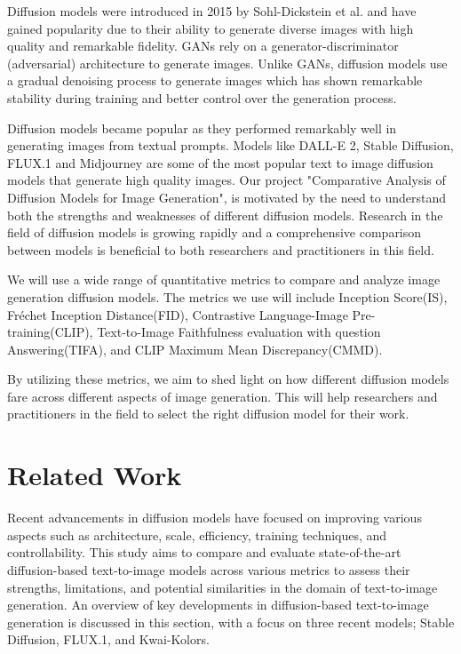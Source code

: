 \documentclass{article}
\begin{document}
Diffusion models were introduced in 2015 by Sohl-Dickstein et al.\cite{sohl2015} and have gained popularity 
due to their ability to generate diverse images with high quality and remarkable fidelity. GANs rely on a 
generator-discriminator (adversarial) architecture to generate images. Unlike GANs, diffusion models use a 
gradual denoising process to generate images which has shown remarkable stability during training and better control
over the generation process.

Diffusion models became popular as they performed remarkably well in generating images from textual prompts. Models like DALL-E 2,
Stable Diffusion, FLUX.1 and Midjourney are some of the most popular text to image diffusion models that generate high quality images. 
Our project "Comparative Analysis of Diffusion Models for Image Generation", is motivated by the 
need to understand both the strengths and weaknesses of different diffusion models. Research in the field of diffusion models 
is growing rapidly and a comprehensive comparison between models is beneficial to both researchers and practitioners in this field.

We will use a wide range of quantitative metrics to compare and analyze image generation diffusion models. 
The metrics we use will include Inception Score(IS), Fréchet Inception Distance(FID),
Contrastive Language-Image Pre-training(CLIP), Text-to-Image Faithfulness evaluation with question Answering(TIFA), and 
CLIP Maximum Mean Discrepancy(CMMD). 

By utilizing these metrics, we aim to shed light on how different diffusion models fare across different aspects
of image generation. This will help researchers and practitioners in the field to select the right diffusion model for their work. 



\section{Related Work}
Recent advancements in diffusion models have focused on improving various aspects such as 
architecture, scale, efficiency, training techniques, and controllability. This study aims to compare and evaluate state-of-the-art 
diffusion-based text-to-image models across various metrics to assess their strengths, limitations, and potential similarities in the 
domain of text-to-image generation. An overview of key developments in diffusion-based text-to-image generation is discussed in this section, 
with a focus on three recent models; Stable Diffusion, FLUX.1, and Kwai-Kolors.
\end{document}
